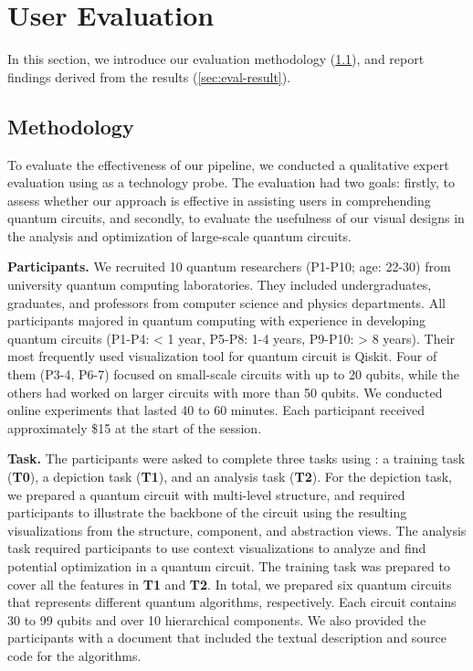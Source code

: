 \section{User Evaluation}
\label{sec:eval}
In this section, we introduce our evaluation methodology (\cref{sec:eval-method}), and report findings derived from the results (\cref{sec:eval-result}).


\subsection{Methodology}
\label{sec:eval-method}
To evaluate the effectiveness of our pipeline, we conducted a qualitative expert evaluation using {\tname} as a technology probe.
The evaluation had two goals:
firstly, to assess whether our approach is effective in assisting users in comprehending quantum circuits,
and secondly, to evaluate the usefulness of our visual designs in the analysis and optimization of large-scale quantum circuits.


\textbf{Participants.}
We recruited 10 quantum researchers (P1-P10; age: 22-30) from university quantum computing laboratories.
They included undergraduates, graduates, and professors from computer science and physics departments.
All participants majored in quantum computing with experience in developing quantum circuits (P1-P4: < 1 year, P5-P8: 1-4 years, P9-P10: > 8 years).
Their most frequently used visualization tool for quantum circuit is Qiskit.
Four of them (P3-4, P6-7) focused on small-scale circuits with up to 20 qubits, while the others had worked on larger circuits with more than 50 qubits.
We conducted online experiments that lasted 40 to 60 minutes. 
Each participant received approximately \$15 at the start of the session.

\textbf{Task.}
The participants were asked to complete three tasks using {\tname}: a training task (\textbf{T0}), a depiction task (\textbf{T1}), and an analysis task (\textbf{T2}).
For the depiction task, we prepared a quantum circuit with multi-level structure, and required participants to illustrate the backbone of the circuit using the resulting visualizations from the structure, component, and abstraction views.
The analysis task required participants to use context visualizations to analyze and find potential optimization in a quantum circuit.
The training task was prepared to cover all the features in \textbf{T1} and \textbf{T2}.
In total, we prepared six quantum circuits that represents different quantum algorithms, respectively.
Each circuit contains 30 to 99 qubits and over 10 hierarchical components.
We also provided the participants with a document that included the textual description and source code for the algorithms.

